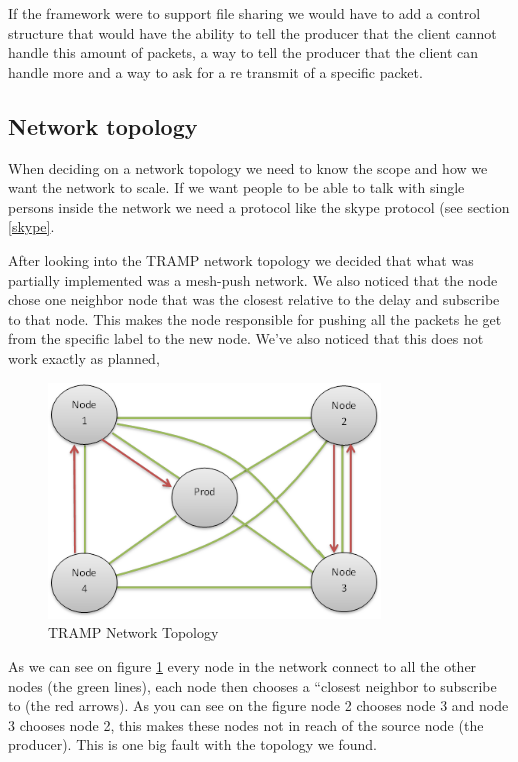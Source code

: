 If the framework were to support file sharing we would have to add a control structure that would have the ability to tell the producer that the client cannot handle this amount of packets, a way to tell the producer that the client can handle more and a way to ask for a re transmit of a specific packet.

\subsection{Network topology}
\label{nettop}
When deciding on a network topology we need to know the scope and how we want the network to scale. If we want people to be able to talk with single persons inside the network we need a protocol like the skype protocol (see section \ref{skype}.

After looking into the TRAMP network topology we decided that what was partially implemented was a mesh-push network. We also noticed that the node chose one neighbor node that was the closest relative to the delay and subscribe to that node. This makes the node responsible for pushing all the packets he get from the specific label to the new node. We've also noticed that this does not work exactly as planned, 

\begin{center}
 \begin{figure}[h!]
  \includegraphics[width=250pt]{TrampNetworkTopology.png}
  \caption{TRAMP Network Topology}
  \label{tramp_topology}
 \end{figure}
\end{center}

As we can see on figure \ref{tramp_topology} every node in the network connect to all the other nodes (the green lines), each node then chooses a ``closest neighbor to subscribe to (the red arrows). As you can see on the figure node 2 chooses node 3 and node 3 chooses node 2, this makes these nodes not in reach of the source node (the producer). This is one big fault with the topology we found.

